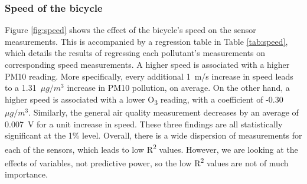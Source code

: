 \documentclass[11pt,twosided,a4paper]{report}
\begin{document}
%

\subsubsection{Speed of the bicycle}

Figure \ref{fig:speed} shows the effect of the bicycle's speed on the sensor measurements. This is accompanied by a regression table in Table \ref{tab:speed}, which details the results of regressing each pollutant's measurements on corresponding speed measurements. A higher speed is associated with a higher PM10 reading. More specifically, every additional 1~m/s increase in speed leads to a 1.31~$\mu g/m^3$ increase in PM10 pollution, on average. On the other hand, a higher speed is associated with a lower O\textsubscript{3} reading, with a coefficient of -0.30~$\mu g/m^3$. Similarly, the general air quality measurement decreases by an average of 0.007~V for a unit increase in speed. These three findings are all statistically significant at the 1\% level. Overall, there is a wide dispersion of measurements for each of the sensors, which leads to low R\textsuperscript{2} values. However, we are looking at the effects of variables, not predictive power, so the low R\textsuperscript{2} values are not of much importance.
\end{document}
